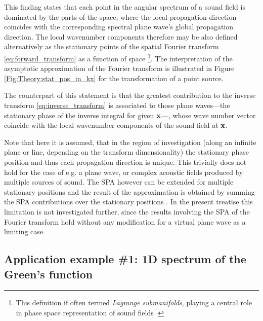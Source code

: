 This finding states that each point in the angular spectrum of a sound field is dominated by the parts of the space, where the local propagation direction coincides with the corresponding spectral plane wave's global propagation direction.
The local wavenumber components therefore may be also defined alternatively as the stationary points of the spatial Fourier transform \eqref{eq:forward_transform} as a function of space \footnote{This definition if often termed \emph{Lagrange submanifolds}, playing a central role in phase space representation of sound fields \cite{Arnold1995, Tinkelman2005, Steinberg1993}.}.
The interpretation of the asymptotic approximation of the Fourier transform is illustrated in Figure \ref{Fig:Theory:stat_pos_in_kx} for the transformation of a point source.

The counterpart of this statement is that the greatest contribution to the inverse transform \eqref{eq:inverse_transform} is associated to those plane waves---the stationary phase of the inverse integral for given $\mathbf{x}$---, whose wave number vector coincide with the local wavenumber components of the sound field at $\mathbf{x}$.

Note that here it is assumed, that in the region of investigation (along an infinite plane or line, depending on the transform dimensionality) the stationary phase position and thus each propagation direction is unique.
This trivially does not hold for the case of e.g. a plane wave, or complex acoustic fields produced by multiple sources of sound.
The SPA however can be extended for multiple stationary positions and the result of the approximation is obtained by summing the SPA contributions over the stationary positions \cite[p. 129]{Bleistein2000}.
In the present treatise this limitation is not investigated further, since the results involving the SPA of the Fourier transform hold without any modification for a virtual plane wave as a limiting case. 	

\subsection*{Application example \#1: 1D spectrum of the Green's function}
\label{sec:greens_function_spectrum}



